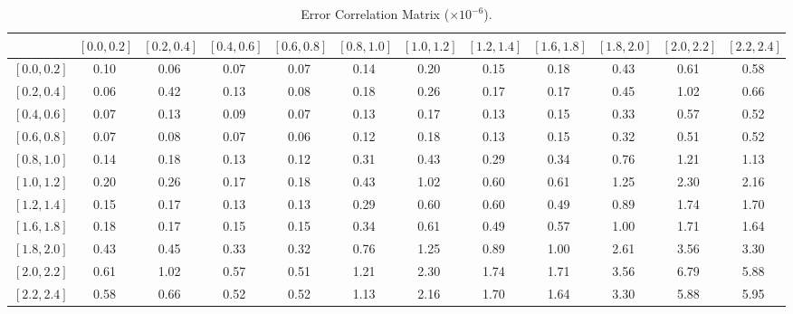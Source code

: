 \begin{table}[htb]
  \begin{center}
    \begin{tabular}{l | c c c c c c c c c c c}
& \scriptsize{$\left[0.0,0.2\right]$}
& \scriptsize{$\left[0.2,0.4\right]$}
& \scriptsize{$\left[0.4,0.6\right]$}
& \scriptsize{$\left[0.6,0.8\right]$}
& \scriptsize{$\left[0.8,1.0\right]$}
& \scriptsize{$\left[1.0,1.2\right]$}
& \scriptsize{$\left[1.2,1.4\right]$}
& \scriptsize{$\left[1.6,1.8\right]$}
& \scriptsize{$\left[1.8,2.0\right]$}
& \scriptsize{$\left[2.0,2.2\right]$}
& \scriptsize{$\left[2.2,2.4\right]$} \\ \hline

\scriptsize{$\left[0.0,0.2\right]$} &0.10 & 0.06 & 0.07 & 0.07 & 0.14 & 0.20 & 0.15 & 0.18 & 0.43 & 0.61 & 0.58 \\
\scriptsize{$\left[0.2,0.4\right]$} &0.06 & 0.42 & 0.13 & 0.08 & 0.18 & 0.26 & 0.17 & 0.17 & 0.45 & 1.02 & 0.66 \\
\scriptsize{$\left[0.4,0.6\right]$} &0.07 & 0.13 & 0.09 & 0.07 & 0.13 & 0.17 & 0.13 & 0.15 & 0.33 & 0.57 & 0.52 \\
\scriptsize{$\left[0.6,0.8\right]$} &0.07 & 0.08 & 0.07 & 0.06 & 0.12 & 0.18 & 0.13 & 0.15 & 0.32 & 0.51 & 0.52 \\
\scriptsize{$\left[0.8,1.0\right]$} &0.14 & 0.18 & 0.13 & 0.12 & 0.31 & 0.43 & 0.29 & 0.34 & 0.76 & 1.21 & 1.13 \\
\scriptsize{$\left[1.0,1.2\right]$} &0.20 & 0.26 & 0.17 & 0.18 & 0.43 & 1.02 & 0.60 & 0.61 & 1.25 & 2.30 & 2.16 \\
\scriptsize{$\left[1.2,1.4\right]$} &0.15 & 0.17 & 0.13 & 0.13 & 0.29 & 0.60 & 0.60 & 0.49 & 0.89 & 1.74 & 1.70 \\
\scriptsize{$\left[1.6,1.8\right]$} &0.18 & 0.17 & 0.15 & 0.15 & 0.34 & 0.61 & 0.49 & 0.57 & 1.00 & 1.71 & 1.64 \\
\scriptsize{$\left[1.8,2.0\right]$} &0.43 & 0.45 & 0.33 & 0.32 & 0.76 & 1.25 & 0.89 & 1.00 & 2.61 & 3.56 & 3.30 \\
\scriptsize{$\left[2.0,2.2\right]$} &0.61 & 1.02 & 0.57 & 0.51 & 1.21 & 2.30 & 1.74 & 1.71 & 3.56 & 6.79 & 5.88 \\
\scriptsize{$\left[2.2,2.4\right]$} &0.58 & 0.66 & 0.52 & 0.52 & 1.13 & 2.16 & 1.70 & 1.64 & 3.30 & 5.88 & 5.95 \\
    \end{tabular}
    \caption{\label{tab:covMatrix}Error Correlation Matrix ($\times 10^{-6}$).}
  \end{center}
\end{table}



